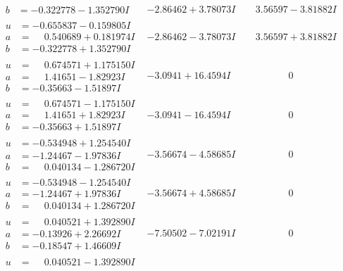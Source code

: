 \documentclass[1p]{elsarticle_modified}
\theoremstyle{definition}
\begin{document}
$$\begin{array}{c|c|c}
\begin{aligned}
b &= -0.322778 - 1.352790 I\end{aligned}
 & -2.86462 + 3.78073 I & \phantom{-}3.56597 - 3.81882 I \\ \hline\begin{aligned}
u &= -0.655837 - 0.159805 I \\
a &= \phantom{-}0.540689 + 0.181974 I \\
b &= -0.322778 + 1.352790 I\end{aligned}
 & -2.86462 - 3.78073 I & \phantom{-}3.56597 + 3.81882 I \\ \hline\begin{aligned}
u &= \phantom{-}0.674571 + 1.175150 I \\
a &= \phantom{-}1.41651 - 1.82923 I \\
b &= -0.35663 - 1.51897 I\end{aligned}
 & -3.0941 + 16.4594 I & \phantom{-0.000000 } 0 \\ \hline\begin{aligned}
u &= \phantom{-}0.674571 - 1.175150 I \\
a &= \phantom{-}1.41651 + 1.82923 I \\
b &= -0.35663 + 1.51897 I\end{aligned}
 & -3.0941 - 16.4594 I & \phantom{-0.000000 } 0 \\ \hline\begin{aligned}
u &= -0.534948 + 1.254540 I \\
a &= -1.24467 - 1.97836 I \\
b &= \phantom{-}0.040134 - 1.286720 I\end{aligned}
 & -3.56674 - 4.58685 I & \phantom{-0.000000 } 0 \\ \hline\begin{aligned}
u &= -0.534948 - 1.254540 I \\
a &= -1.24467 + 1.97836 I \\
b &= \phantom{-}0.040134 + 1.286720 I\end{aligned}
 & -3.56674 + 4.58685 I & \phantom{-0.000000 } 0 \\ \hline\begin{aligned}
u &= \phantom{-}0.040521 + 1.392890 I \\
a &= -0.13926 + 2.26692 I \\
b &= -0.18547 + 1.46609 I\end{aligned}
 & -7.50502 - 7.02191 I & \phantom{-0.000000 } 0 \\ \hline\begin{aligned}
u &= \phantom{-}0.040521 - 1.392890 I \\

\end{aligned}
\end{array}$$
\end{document}
